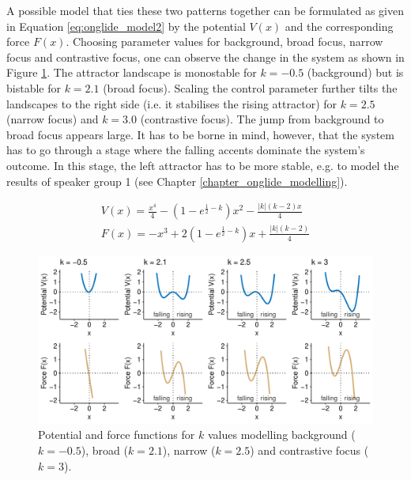 A possible model that ties these two patterns together can be formulated as given in Equation \ref{eq:onglide_model2} by the potential $V(x)$ and the corresponding force $F(x)$. Choosing parameter values for background, broad focus, narrow focus and contrastive focus, one can observe the change in the system as shown in Figure \ref{fig:potentials_force_bg_br_na_co}. The attractor landscape is monostable for $k = -0.5$ (background) but is bistable for $k = 2.1$ (broad focus). Scaling the control parameter further tilts the landscapes to the right side (i.e. it stabilises the rising attractor) for $k = 2.5$ (narrow focus) and $k = 3.0$ (contrastive focus). The jump from background to broad focus appears large. It has to be borne in mind, however, that the system has to go through a stage where the falling accents dominate the system's outcome. In this stage, the left attractor has to be more stable, e.g. to model the results of speaker group 1 (see Chapter \ref{chapter_onglide_modelling}).

\begin{equation}
\begin{split}
V(x) = \frac{x^4}{4} - (1-e^{\frac{1}{2}-k})x^2 - \frac{|k|(k-2)x}{4} \\
F(x) = - x^3 + 2(1-e^{\frac{1}{2}-k})x + \frac{|k|(k-2)}{4}
\label{eq:onglide_model2}
\end{split}
\end{equation}

\begin{figure}[htbp]
\begin{center}
\includegraphics[width=\textwidth]{figures/ch7/potentials_force_model2.pdf}
\caption{Potential and force functions for $k$ values modelling background ($k=-0.5$), broad ($k=2.1$), narrow ($k=2.5$) and contrastive focus ($k=3$).}
\label{fig:potentials_force_bg_br_na_co}
\end{center}
\end{figure}

